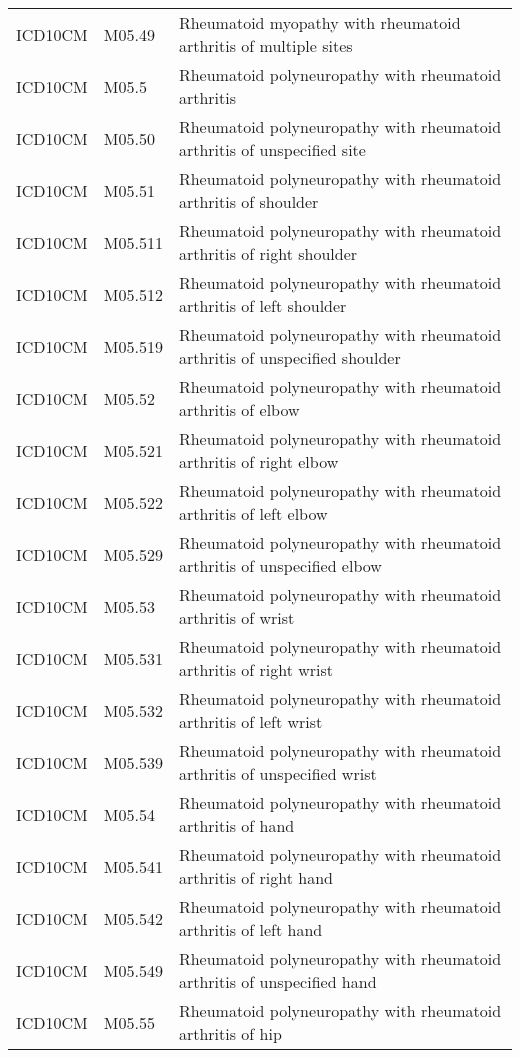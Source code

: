\begin{longtable}{p{}p{}p{}}
  ICD10CM & M05.49 & Rheumatoid myopathy with rheumatoid arthritis of multiple sites \\ 
  ICD10CM & M05.5 & Rheumatoid polyneuropathy with rheumatoid arthritis \\ 
  ICD10CM & M05.50 & Rheumatoid polyneuropathy with rheumatoid arthritis of unspecified site \\ 
  ICD10CM & M05.51 & Rheumatoid polyneuropathy with rheumatoid arthritis of shoulder \\ 
  ICD10CM & M05.511 & Rheumatoid polyneuropathy with rheumatoid arthritis of right shoulder \\ 
  ICD10CM & M05.512 & Rheumatoid polyneuropathy with rheumatoid arthritis of left shoulder \\ 
  ICD10CM & M05.519 & Rheumatoid polyneuropathy with rheumatoid arthritis of unspecified shoulder \\ 
  ICD10CM & M05.52 & Rheumatoid polyneuropathy with rheumatoid arthritis of elbow \\ 
  ICD10CM & M05.521 & Rheumatoid polyneuropathy with rheumatoid arthritis of right elbow \\ 
  ICD10CM & M05.522 & Rheumatoid polyneuropathy with rheumatoid arthritis of left elbow \\ 
  ICD10CM & M05.529 & Rheumatoid polyneuropathy with rheumatoid arthritis of unspecified elbow \\ 
  ICD10CM & M05.53 & Rheumatoid polyneuropathy with rheumatoid arthritis of wrist \\ 
  ICD10CM & M05.531 & Rheumatoid polyneuropathy with rheumatoid arthritis of right wrist \\ 
  ICD10CM & M05.532 & Rheumatoid polyneuropathy with rheumatoid arthritis of left wrist \\ 
  ICD10CM & M05.539 & Rheumatoid polyneuropathy with rheumatoid arthritis of unspecified wrist \\ 
  ICD10CM & M05.54 & Rheumatoid polyneuropathy with rheumatoid arthritis of hand \\ 
  ICD10CM & M05.541 & Rheumatoid polyneuropathy with rheumatoid arthritis of right hand \\ 
  ICD10CM & M05.542 & Rheumatoid polyneuropathy with rheumatoid arthritis of left hand \\ 
  ICD10CM & M05.549 & Rheumatoid polyneuropathy with rheumatoid arthritis of unspecified hand \\ 
  ICD10CM & M05.55 & Rheumatoid polyneuropathy with rheumatoid arthritis of hip \\ 

\end{longtable}
